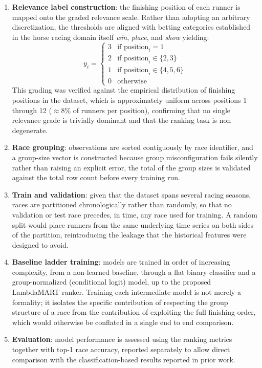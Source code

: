 \begin{enumerate}
    \item \textbf{Relevance label construction}: 
    the finishing position of each runner is mapped onto the graded relevance scale. Rather than adopting an arbitrary discretization, the thresholds are aligned with betting categories established in the horse racing domain itself \textit{win}, \textit{place}, and \textit{show}  yielding:
\begin{equation}
y_i =
\begin{cases}
3 & \text{if position}_i = 1 \\
2 & \text{if position}_i \in \{2, 3\} \\
1 & \text{if position}_i \in \{4, 5, 6\} \\
0 & \text{otherwise}
\end{cases}
\end{equation}
This grading was verified against the empirical distribution of finishing positions in the dataset, which is approximately uniform across positions 1 through 12 ($\approx$8\% of runners per position), confirming that no single relevance grade is trivially dominant and that the ranking task is non degenerate.

\item \textbf{Race grouping}: observations are sorted contiguously by race identifier, and a group-size vector is constructed because group misconfiguration fails silently rather than raising an explicit error, the total of the group sizes is validated against the total row count before every training run.

\item \textbf{Train and validation}: given that the dataset spans several racing seasons, races are partitioned chronologically rather than randomly, so that no validation or test race precedes, in time, any race used for training. A random split would place runners from the same underlying time series on both sides of the partition, reintroducing the leakage that the historical features were designed to avoid.

\item \textbf{Baseline ladder training}: models are trained in order of increasing complexity, from a non-learned baseline, through a flat binary classifier and a group-normalized (conditional logit) model, up to the proposed LambdaMART ranker. Training each intermediate model is not merely a formality; it isolates the specific contribution of respecting the group structure of a race from the contribution of exploiting the full finishing order, which would otherwise be conflated in a single end to end comparison.

\item \textbf{Evaluation}: model performance is assessed using the ranking metrics together with top-1 race accuracy, reported separately to allow direct comparison with the classification-based results reported in prior work.
    
\end{enumerate}


